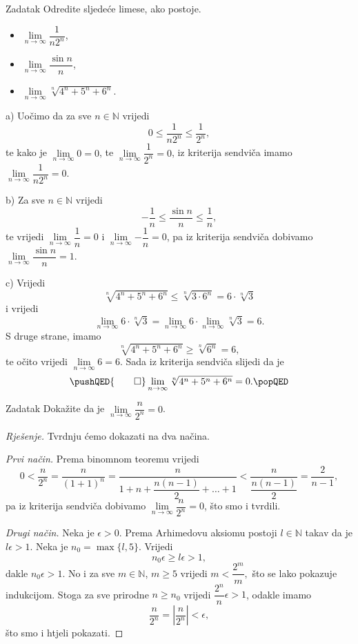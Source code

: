\begin{exercise}{Zadatak} Odredite sljedeće limese, ako postoje.
\begin{itemize}
\item[a)] \(\lim\limits_{n\to \infty}{\dfrac{1}{n2^n}}\),
\item[b)] \(\lim\limits_{n\to \infty}{\dfrac{\sin{n}}{n}}\),
\item[c)] \(\lim\limits_{n\to \infty}{\sqrt[n]{4^n+5^n+6^n}}\).
\end{itemize}
\end{exercise}
\begin{proof*}
a) Uočimo da za sve \(n\in \mathbb{N}\) vrijedi
\[0\leq \dfrac{1}{n2^n}\leq \dfrac{1}{2^n},\]
te kako je \(\lim\limits_{n\to \infty}{0}=0\), te \(\lim\limits_{n\to \infty}{\dfrac{1}{2^n}}=0\), iz kriterija sendviča imamo \(\lim\limits_{n\to \infty}{\dfrac{1}{n2^n}}=0\).

b) Za sve \(n\in \mathbb{N}\) vrijedi
\[-\dfrac{1}{n}\leq \dfrac{\sin{n}}{n}\leq \dfrac{1}{n},\]
te vrijedi \(\lim\limits_{n\to \infty}{\dfrac{1}{n}}=0\) i \(\lim\limits_{n\to \infty}{-\dfrac{1}{n}}=0\), pa iz kriterija sendviča dobivamo \(\lim\limits_{n\to \infty}{\dfrac{\sin{n}}{n}}=1\).

c) Vrijedi \[\sqrt[n]{4^n+5^n+6^n}\leq \sqrt[n]{3\cdot 6^n}=6\cdot \sqrt[n]{3}\] i vrijedi \[\lim\limits_{n\to \infty}{6\cdot \sqrt[n]{3}}=\lim\limits_{n\to \infty}{6}\cdot \lim\limits_{n\to \infty}{\sqrt[n]{3}}=6.\] S druge strane, imamo \[\sqrt[n]{4^n+5^n+6^n}\geq \sqrt[n]{6^n}=6,\] 
te očito vrijedi \(\lim\limits_{n\to \infty}{6}=6\). Sada iz kriterija sendviča slijedi da je
\[
\pushQED{\qed}
\lim\limits_{n\to \infty}{\sqrt[n]{4^n+5^n+6^n}}=0.\qedhere
\popQED
\]
\end{proof*}
\begin{exercise}{Zadatak}
\label{7}
Dokažite da je \(\lim\limits_{n\to \infty}{\dfrac{n}{2^n}}=0\).
\end{exercise}
\begin{proof}[Rješenje] Tvrdnju ćemo dokazati na dva načina.

\textit{Prvi način.} Prema binomnom teoremu vrijedi
\[0<\dfrac{n}{2^n}=\dfrac{n}{(1+1)^n}=\dfrac{n}{1+n+\dfrac{n(n-1)}{2}+\dots+1}<\dfrac{n}{\dfrac{n(n-1)}{2}}=\dfrac{2}{n-1},\]
pa iz kriterija sendviča dobivamo \(\lim\limits_{n\to \infty}{\dfrac{n}{2^n}}=0\), što smo i tvrdili.

\textit{Drugi način.} Neka je \(\epsilon>0\). Prema Arhimedovu aksiomu postoji \(l\in \mathbb{N}\) takav da je \(l\epsilon>1\). Neka je \(n_0=\max\{l, 5\}\). Vrijedi
\[n_0\epsilon\geq l\epsilon>1,\]
dakle \(n_0\epsilon>1\). No i za sve \(m\in \mathbb{N}\), \(m\geq 5\) vrijedi \(m<\dfrac{2^m}{m},\) što se lako pokazuje indukcijom. Stoga za sve prirodne \(n\geq n_0\) vrijedi \(\dfrac{2^{n}}{n}\epsilon>1\), odakle imamo \[\dfrac{n}{2^n}=\left\lvert \dfrac{n}{2^n}\right\rvert<\epsilon,\]
što smo i htjeli pokazati.
\end{proof}
